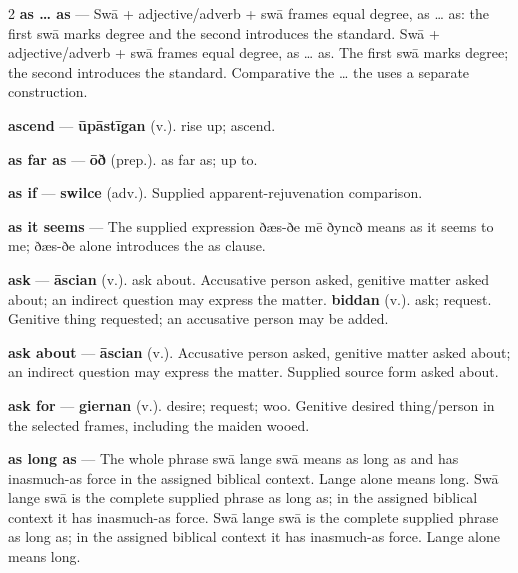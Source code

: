 \begin{multicols}{2}
\textbf{as … as} — Swā + adjective/adverb + swā frames equal degree, as … as: the first swā marks degree and the second introduces the standard. Swā + adjective/adverb + swā frames equal degree, as … as. The first swā marks degree; the second introduces the standard. Comparative the … the uses a separate construction.\par
\textbf{ascend} — \textbf{ūpāstīgan} (v.). rise up; ascend.\par
\textbf{as far as} — \textbf{ōð} (prep.). as far as; up to.\par
\textbf{as if} — \textbf{swilce} (adv.). Supplied apparent-rejuvenation comparison.\par
\textbf{as it seems} — The supplied expression ðæs-ðe mē ðyncð means as it seems to me; ðæs-ðe alone introduces the as clause.\par
\textbf{ask} — \textbf{āscian} (v.). ask about. Accusative person asked, genitive matter asked about; an indirect question may express the matter. \textbf{biddan} (v.). ask; request. Genitive thing requested; an accusative person may be added.\par
\textbf{ask about} — \textbf{āscian} (v.). Accusative person asked, genitive matter asked about; an indirect question may express the matter. Supplied source form asked about.\par
\textbf{ask for} — \textbf{giernan} (v.). desire; request; woo. Genitive desired thing/person in the selected frames, including the maiden wooed.\par
\textbf{as long as} — The whole phrase swā lange swā means as long as and has inasmuch-as force in the assigned biblical context. Lange alone means long. Swā lange swā is the complete supplied phrase as long as; in the assigned biblical context it has inasmuch-as force. Swā lange swā is the complete supplied phrase as long as; in the assigned biblical context it has inasmuch-as force. Lange alone means long.\par

\end{multicols}
